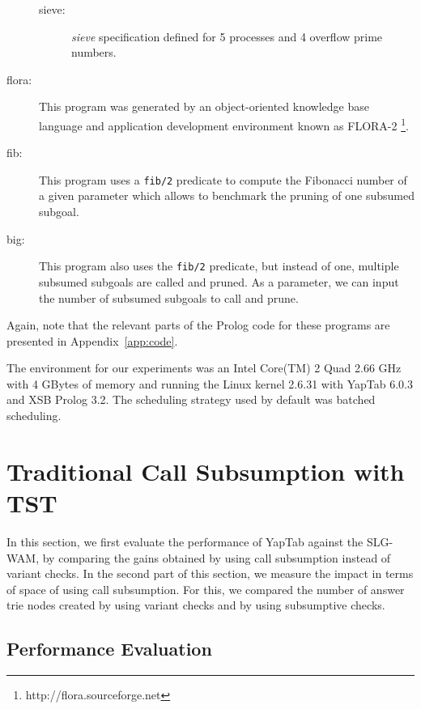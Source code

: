 \begin{description}
\begin{description}
         \item[sieve:] \emph{sieve} specification defined for 5 processes and 4 overflow prime numbers.

      \end{description}
      
   \item[flora:] This program was generated by an object-oriented knowledge base language and application 
               development environment known as FLORA-2 \cite{Yang-00}\footnote{http://flora.sourceforge.net}.
               
   \item[fib:] This program uses a \texttt{fib/2} predicate to compute the Fibonacci number of a given
   parameter which allows to benchmark the pruning of one subsumed subgoal.
   
   \item[big:] This program also uses the \texttt{fib/2} predicate, but instead of one, multiple subsumed subgoals
   are called and pruned. As a parameter, we can input the number of subsumed subgoals to call and prune.
   
\end{description}

Again, note that the relevant parts of the Prolog code for these programs are presented in Appendix~\ref{app:code}.

The environment for our experiments was an Intel Core(TM) 2 Quad 2.66 GHz with 4 GBytes of
memory and running the Linux kernel 2.6.31 with YapTab 6.0.3 and XSB Prolog 3.2.
The scheduling strategy used by default was batched scheduling.

\section{Traditional Call Subsumption with TST}

In this section, we first evaluate the performance of YapTab against the SLG-WAM,
by comparing the gains obtained by using call subsumption instead of variant checks.
In the second part of this section, we measure the impact in terms of space of using call subsumption.
For this, we compared the number of answer trie nodes created by using variant checks and by using subsumptive
checks.

\subsection{Performance Evaluation}

